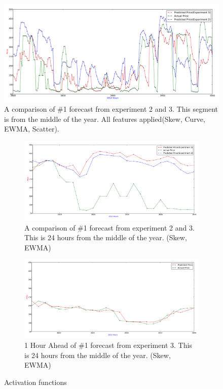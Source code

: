 \begin{figure}[H]
\centering
\includegraphics[width=\linewidth,natwidth=898,natheight=587]{billeder/PriceExperimentalAnalysis/X2_X3_AllFeatures_3800_4000.png}
\caption{A comparison of \#1 forecast from experiment 2 and 3. This segment is from the middle of the year. All features applied(Skew, Curve, EWMA, Scatter).}
\label{fig:X2_X3_AllParameters_3800_4000}
\end{figure}

\begin{figure}[H]
\centering
\begin{subfigure}{.5\textwidth}
  \centering
	\includegraphics[width=\linewidth,natwidth=898,natheight=587]{billeder/PriceExperimentalAnalysis/X2_X3_3816_3840.png}
	\caption{A comparison of \#1 forecast from experiment 2 and 3. This is 24 hours from the middle of the year. (Skew, EWMA)}
	\label{fig:X2_X3_3816_3840}
\end{subfigure}%
\begin{subfigure}{.5\textwidth}
  \centering
	\includegraphics[width=\linewidth,natwidth=898,natheight=587]{billeder/PriceExperimentalAnalysis/X2_X3_3816_3840_1hourAhead.png}
	\caption{1 Hour Ahead of \#1 forecast from experiment 3. This is 24 hours from the middle of the year. (Skew, EWMA)}
	\label{fig:X2_X3_3816_3840_1hourahead}
\end{subfigure}
\caption{Activation functions}
\label{fig:test}
\end{figure}

